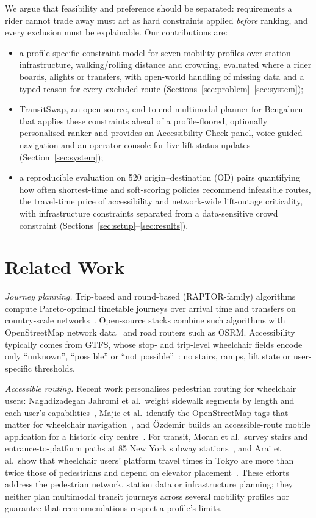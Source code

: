 \documentclass[conference]{IEEEtran}
\begin{document}
We argue that feasibility and preference should be separated: requirements a rider cannot trade away must act as hard constraints applied \emph{before} ranking, and every exclusion must be explainable. Our contributions are:
\begin{itemize}
\item a profile-specific constraint model for seven mobility profiles over station infrastructure, walking/rolling distance and crowding, evaluated where a rider boards, alights or transfers, with open-world handling of missing data and a typed reason for every excluded route (Sections~\ref{sec:problem}--\ref{sec:system});
\item TransitSwap, an open-source, end-to-end multimodal planner for Bengaluru that applies these constraints ahead of a profile-floored, optionally personalised ranker and provides an Accessibility Check panel, voice-guided navigation and an operator console for live lift-status updates (Section~\ref{sec:system});
\item a reproducible evaluation on 520 origin--destination (OD) pairs quantifying how often shortest-time and soft-scoring policies recommend infeasible routes, the travel-time price of accessibility and network-wide lift-outage criticality, with infrastructure constraints separated from a data-sensitive crowd constraint (Sections~\ref{sec:setup}--\ref{sec:results}).
\end{itemize}

\section{Related Work}\label{sec:related}

\textit{Journey planning.} Trip-based and round-based (RAPTOR-family) algorithms compute Pareto-optimal timetable journeys over arrival time and transfers on country-scale networks~\cite{agarwal2024tbtr,grossmann2026flash}. Open-source stacks combine such algorithms with OpenStreetMap network data~\cite{acharya2025osm} and road routers such as OSRM. Accessibility typically comes from GTFS, whose stop- and trip-level wheelchair fields encode only ``unknown'', ``possible'' or ``not possible''~\cite{gtfs}: no stairs, ramps, lift state or user-specific thresholds.

\textit{Accessible routing.} Recent work personalises pedestrian routing for wheelchair users: Naghdizadegan Jahromi et al.\ weight sidewalk segments by length and each user's capabilities~\cite{naghdizadegan2025sidewalk}, Majic et al.\ identify the OpenStreetMap tags that matter for wheelchair navigation~\cite{majic2026osm}, and Özdemir builds an accessible-route mobile application for a historic city centre~\cite{ozdemir2025routes}. For transit, Moran et al.\ survey stairs and entrance-to-platform paths at 85 New York subway stations~\cite{moran2026stairway}, and Arai et al.\ show that wheelchair users' platform travel times in Tokyo are more than twice those of pedestrians and depend on elevator placement~\cite{arai2026elevator}. These efforts address the pedestrian network, station data or infrastructure planning; they neither plan multimodal transit journeys across several mobility profiles nor guarantee that recommendations respect a profile's limits.
\end{document}
